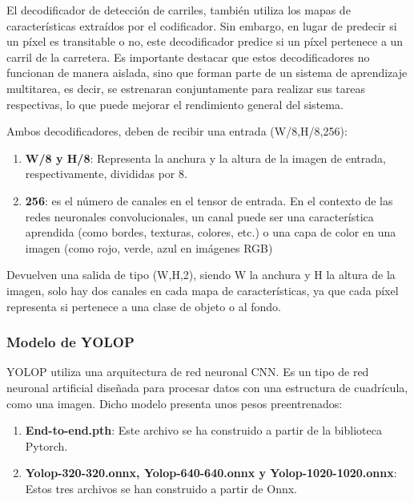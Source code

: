 El decodificador de detección de carriles, también utiliza los mapas de características extraídos 
por el codificador. Sin embargo, en lugar de predecir si un píxel es transitable o no, este decodificador
predice si un píxel pertenece a un carril de la carretera. \newline
Es importante destacar que estos decodificadores no funcionan de manera aislada, sino que forman parte
de un sistema de aprendizaje multitarea, es decir, se estrenaran conjuntamente para realizar sus tareas
respectivas, lo que puede mejorar el rendimiento general del sistema.\newline

Ambos decodificadores, deben de recibir una entrada (W/8,H/8,256): \newline 
\begin{enumerate}
  \item \textbf{W/8 y H/8}: Representa la anchura y la altura de la imagen de entrada, respectivamente, divididas por 8.
  \item \textbf{256}: es el número de 
  canales en el tensor de entrada. En el contexto de las redes neuronales convolucionales, 
  un canal puede ser una característica aprendida (como bordes, texturas, colores, etc.) o una capa de color en una imagen (como rojo, verde, azul en imágenes RGB)
\end{enumerate}

Devuelven una salida de tipo (W,H,2), siendo W la anchura y H la altura de la imagen, solo hay dos canales en cada mapa de características, ya que cada píxel 
representa si pertenece a una clase de objeto o al fondo. 

\subsubsection{Modelo de YOLOP}
\label{sec:Modelo_YOLOP}

YOLOP utiliza una arquitectura de red neuronal CNN. Es un tipo de red neuronal artificial diseñada para procesar datos con una
estructura de cuadrícula, como una imagen. Dicho modelo presenta unos pesos preentrenados: 

\begin{enumerate}
  \item \textbf{End-to-end.pth}: Este archivo se ha construido a partir de la biblioteca Pytorch. 
  \item \textbf{Yolop-320-320.onnx, Yolop-640-640.onnx y Yolop-1020-1020.onnx}: Estos tres archivos se han construido a partir de Onnx.
\end{enumerate}

